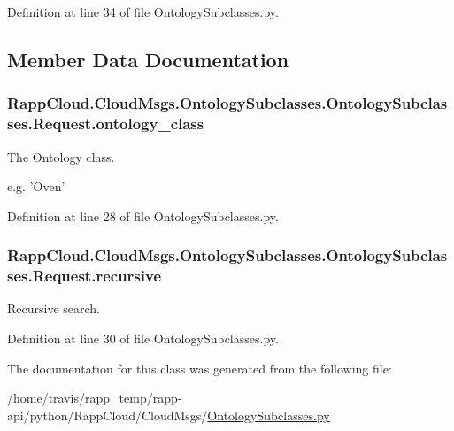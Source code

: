 Definition at line 34 of file Ontology\-Subclasses.\-py.



\subsection{Member Data Documentation}
\hypertarget{classRappCloud_1_1CloudMsgs_1_1OntologySubclasses_1_1OntologySubclasses_1_1Request_a553f7be7723024bd5fdfaa89f2eb5e3d}{
\subsubsection[{ontology\-\_\-class}]{\setlength{\rightskip}{0pt plus 5cm}Rapp\-Cloud.\-Cloud\-Msgs.\-Ontology\-Subclasses.\-Ontology\-Subclasses.\-Request.\-ontology\-\_\-class}}\label{classRappCloud_1_1CloudMsgs_1_1OntologySubclasses_1_1OntologySubclasses_1_1Request_a553f7be7723024bd5fdfaa89f2eb5e3d}


The Ontology class. 

e.\-g. 'Oven' 

Definition at line 28 of file Ontology\-Subclasses.\-py.

\hypertarget{classRappCloud_1_1CloudMsgs_1_1OntologySubclasses_1_1OntologySubclasses_1_1Request_aee51b66447b03981a8f7fa8895bd8791}{
\subsubsection[{recursive}]{\setlength{\rightskip}{0pt plus 5cm}Rapp\-Cloud.\-Cloud\-Msgs.\-Ontology\-Subclasses.\-Ontology\-Subclasses.\-Request.\-recursive}}\label{classRappCloud_1_1CloudMsgs_1_1OntologySubclasses_1_1OntologySubclasses_1_1Request_aee51b66447b03981a8f7fa8895bd8791}


Recursive search. 



Definition at line 30 of file Ontology\-Subclasses.\-py.



The documentation for this class was generated from the following file\-:\begin{DoxyCompactItemize}
\item 
/home/travis/rapp\-\_\-temp/rapp-\/api/python/\-Rapp\-Cloud/\-Cloud\-Msgs/\hyperlink{OntologySubclasses_8py}{Ontology\-Subclasses.\-py}\end{DoxyCompactItemize}
